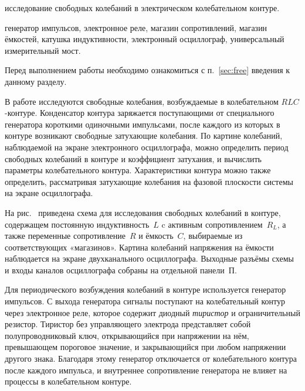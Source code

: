 
\begin{lab:aim}
исследование свободных колебаний в электрическом колебательном контуре.
\end{lab:aim}

\begin{lab:equipment}
генератор импульсов, электронное реле, магазин сопротивлений, магазин ёмкостей, 
катушка индуктивности, электронный осциллограф, универсальный измерительный мост.
\end{lab:equipment}

Перед выполнением работы необходимо ознакомиться с п.~\ref{sec:free}
введения к данному разделу.

В работе исследуются свободные колебания, возбуждаемые в колебательном $RLC$-контуре. 
Конденсатор контура заряжается поступающими от специального генератора короткими 
одиночными импульсами, после каждого из которых в контуре возникают свободные 
затухающие колебания. По картине колебаний, наблюдаемой на экране электронного осциллографа,
можно определить период свободных колебаний в контуре и коэффициент затухания,
и вычислить параметры колебательного контура. Характеристики контура 
можно также определить, рассматривая затухающие колебания на фазовой плоскости системы 
на экране осциллографа.

\experiment 


На рис.~ приведена схема для исследования свободных колебаний в контуре, 
содержащем постоянную индуктивность~$L$ c активным сопротивлением~$R_L$, 
а также переменные сопротивление~$R$ и ёмкость~$C$, 
выбираемые из соответствующих «магазинов». Картина колебаний напряжения 
на ёмкости наблюдается на экране двухканального осциллографа.
Выходные разъёмы схемы и входы каналов осциллографа собраны на 
отдельной панели~П.

Для периодического возбуждения колебаний в контуре используется генератор 
импульсов. С выхода генератора сигналы поступают на колебательный контур 
через электронное реле, которое содержит диодный \emph{тиристор} и ограничительный 
резистор. Тиристор без управляющего электрода представляет собой 
полупроводниковый ключ, открывающийся при напряжении на нём, превышающем 
пороговое значение, и закрывающийся при любом напряжении другого знака. 
Благодаря этому генератор отключается от колебательного контура после каждого 
импульса, и внутреннее сопротивление генератора не влияет на процессы 
в колебательном контуре.

